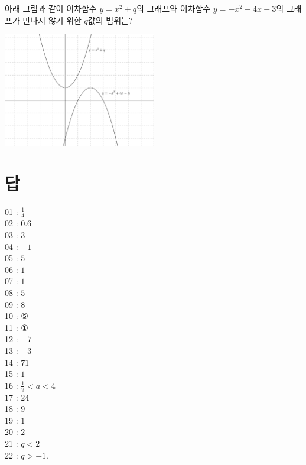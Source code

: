 \documentclass{article}
\newcommand\bp[1]{\begin{mdframed}[frametitle={#1},skipabove=10pt,skipbelow=20pt,innertopmargin=5pt,innerbottommargin=40pt]}
\newcommand\ep{\end{mdframed}\par}
\begin{document}
\bp{22(cf. 1506)}
아래 그림과 같이 이차함수 \(y = x^2 +q\)의 그래프와 이차함수 \(y=-x^2+4x-3\)의 그래프가 만나지 않기 위한 \(q\)값의 범위는?
\par\medskip
\begin{center}
\includegraphics[width=0.5\textwidth]{problem_22}
\end{center}\medskip
\par
\ep

\newpage
\section*{답}
01 : \(\frac14\)\\
02 : \(0.6\)\\
03 : \(3\)\\
04 : \(-1\)\\
05 : \(5\)\\
06 : \(1\)\\
07 : \(1\)\\
08 : \(5\)\\
09 : \(8\)\\
10 : ⑤\\
11 : ①\\
12 : \(-7\)\\
13 : \(-3\)\\
14 : \(71\)\\
15 : \(1\)\\
16 : \(\frac19<a<4\)\\
17 : \(24\) \\
18 : \(9\)\\
19 : \(1\)\\
20 : \(2\)\\
21 : \(q<2\)\\
22 : \(q>-1\).
\end{document}
